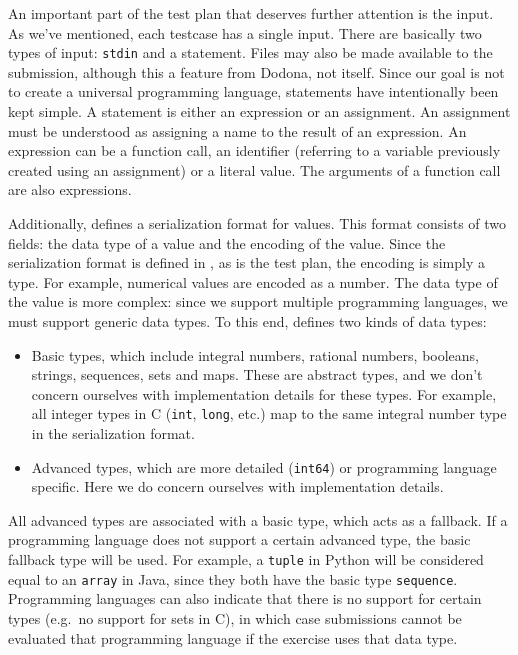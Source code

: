\documentclass[5p,number]{elsarticle}
\begin{document}
    An important part of the test plan that deserves further attention is the input.
    As we've mentioned, each testcase has a single input.
    There are basically two types of input: \texttt{stdin} and a statement.
    Files may also be made available to the submission, although this a feature from Dodona, not \tested{} itself.
    Since our goal is not to create a universal programming language, statements have intentionally been kept simple.
    A statement is either an expression or an assignment.
    An assignment must be understood as assigning a name to the result of an expression.
    An expression can be a function call, an identifier (referring to a variable previously created using an assignment) or a literal value.
    The arguments of a function call are also expressions.

    Additionally, \tested{} defines a serialization format for values.
    This format consists of two fields: the data type of a value and the encoding of the value.
    Since the serialization format is defined in , as is the test plan, the encoding is simply a  type.
    For example, numerical values are encoded as a  number.
    The data type of the value is more complex: since we support multiple programming languages, we must support generic data types.
    To this end, \tested{} defines two kinds of data types:

    \begin{itemize}
        \item Basic types, which include integral numbers, rational numbers, booleans, strings, sequences, sets and maps.
        These are abstract types, and we don't concern ourselves with implementation details for these types.
        For example, all integer types in C (\texttt{int}, \texttt{long}, etc.) map to the same integral number type in the serialization format.
        \item Advanced types, which are more detailed (\texttt{int64}) or programming language specific.
        Here we do concern ourselves with implementation details.
    \end{itemize}

    All advanced types are associated with a basic type, which acts as a fallback.
    If a programming language does not support a certain advanced type, the basic fallback type will be used.
    For example, a \texttt{tuple} in Python will be considered equal to an \texttt{array} in Java, since they both have the basic type \texttt{sequence}.
    Programming languages can also indicate that there is no support for certain types (e.g.\ no support for sets in C), in which case submissions cannot be evaluated that programming language if the exercise uses that data type.
    
\end{document}
